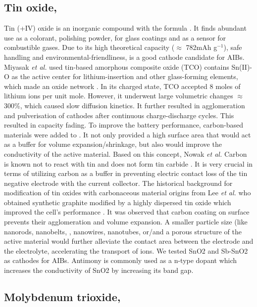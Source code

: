 \subsection*{Tin oxide, }
Tin (+IV) oxide is an inorganic compound with the formula . It finds abundant use as a colorant, polishing powder, for glass coatings and as a sensor for combustible gases. Due to its high theoretical capacity ($\approx$ 782mAh g$^{-1}$), safe handling and environmental-friendliness,  is a good cathode candidate for AIBs. Miyasak \textit{et al.} used tin-based amorphous composite oxide (TCO) contains Sn(II)-O as the active center for lithium-insertion and other glass-forming elements, which made an oxide network \cite{idota_tin-based_1997}. In its charged state, TCO accepted 8 moles of lithium ions per unit mole. However, it underwent large volumetric changes $\approx$ 300{\%}, which caused slow diffusion kinetics. It further resulted in agglomeration and pulverisation of cathodes after continuous charge-discharge cycles. This resulted in capacity fading. To improve the battery performance, carbon-based materials were added to . It not only provided a high surface area that would act as a buffer for volume expansion/shrinkage, but also would improve the conductivity of the active material. Based on this concept, Nowak \textit{et al.} \cite{nowak_composites_2018}
Carbon is known not to react with tin and does not form tin carbide \cite{}. It is very crucial in terms of utilizing carbon as a buffer in preventing electric contact loss of the tin negative electrode with the current collector\cite{}. The historical background for modification of tin oxides with carbonaceous material origins from Lee \textit{et al.} who obtained synthetic graphite modified by a highly dispersed tin oxide which improved the cell's performance \cite{navarro-suarez_2d_nodate}. 
It was observed that carbon coating on  surface prevents their agglomeration and volume expansion. A smaller particle size (like nanorods\cite{}, nanobelts\cite{}, , nanowires\cite{}, nanotubes\cite{}, or/and a porous structure of the active material would further alleviate the contact area between the electrode and the electrolyte, accelerating the transport of ions. 
We tested SnO2 and Sb-SnO2 as cathodes for AIBs. Antimony is commonly used as a n-type dopant which increases the conductivity of SnO2 by increasing its band gap. 
\subsection*{Molybdenum trioxide, }


